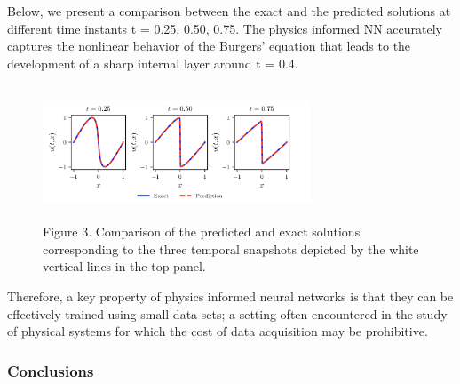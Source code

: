 \documentclass{beamer}
\def\\{}%
\begin{document}
\begin{frame}

Below, we present a comparison between the exact and the predicted solutions at
different time instants t = 0.25, 0.50, 0.75. The physics informed NN accurately
captures the nonlinear behavior of the Burgers' equation that leads to the
development of a sharp internal layer around t = 0.4.
    
\begin{figure}
\centering
\includegraphics[width = 8cm , height = 4cm]{images/exact_pred_burgers.png}
\\
\caption{Figure 3. Comparison of the predicted and exact solutions
corresponding to the three temporal snapshots depicted by the white vertical
lines in the top panel.}
\end{figure}

\end{frame}

\begin{frame}

Therefore, a key property of physics informed neural networks is that they can
be effectively trained using small data sets; a setting often encountered in the
study of physical systems for which the cost of data acquisition may be
prohibitive.
    
\end{frame}


\begin{frame}
    \frametitle{Conclusions}

\end{frame}




\end{document}
